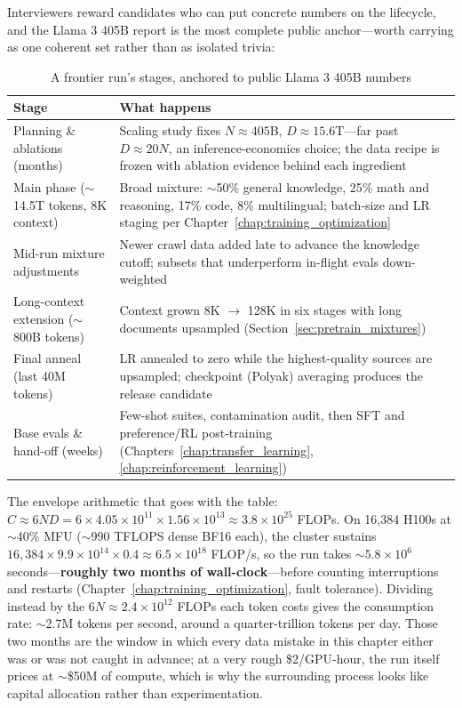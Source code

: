 Interviewers reward candidates who can put concrete numbers on the lifecycle, and the Llama 3 405B report is the most complete public anchor---worth carrying as one coherent set rather than as isolated trivia:

\begin{table}[H]
\centering
\small
\caption{A frontier run's stages, anchored to public Llama 3 405B numbers}
\label{tab:pretrain_reference_run}
\begin{tabularx}{\textwidth}{lX}
\toprule
\textbf{Stage} & \textbf{What happens} \\
\midrule
Planning \& ablations (months) & Scaling study fixes $N \approx 405$B, $D \approx 15.6$T---far past $D \approx 20N$, an inference-economics choice; the data recipe is frozen with ablation evidence behind each ingredient \\
Main phase ($\sim$14.5T tokens, 8K context) & Broad mixture: $\sim$50\% general knowledge, 25\% math and reasoning, 17\% code, 8\% multilingual; batch-size and LR staging per Chapter~\ref{chap:training_optimization} \\
Mid-run mixture adjustments & Newer crawl data added late to advance the knowledge cutoff; subsets that underperform in-flight evals down-weighted \\
Long-context extension ($\sim$800B tokens) & Context grown 8K $\rightarrow$ 128K in six stages with long documents upsampled (Section~\ref{sec:pretrain_mixtures}) \\
Final anneal (last 40M tokens) & LR annealed to zero while the highest-quality sources are upsampled; checkpoint (Polyak) averaging produces the release candidate \\
Base evals \& hand-off (weeks) & Few-shot suites, contamination audit, then SFT and preference/RL post-training (Chapters~\ref{chap:transfer_learning}, \ref{chap:reinforcement_learning}) \\
\bottomrule
\end{tabularx}
\end{table}

The envelope arithmetic that goes with the table: $C \approx 6ND = 6 \times 4.05 \times 10^{11} \times 1.56 \times 10^{13} \approx 3.8 \times 10^{25}$ FLOPs. On 16{,}384 H100s at $\sim$40\% MFU ($\sim$990 TFLOPS dense BF16 each), the cluster sustains $16{,}384 \times 9.9 \times 10^{14} \times 0.4 \approx 6.5 \times 10^{18}$ FLOP/s, so the run takes $\sim 5.8 \times 10^{6}$ seconds---\textbf{roughly two months of wall-clock}---before counting interruptions and restarts (Chapter~\ref{chap:training_optimization}, fault tolerance). Dividing instead by the $6N \approx 2.4 \times 10^{12}$ FLOPs each token costs gives the consumption rate: $\sim$2.7M tokens per second, around a quarter-trillion tokens per day. Those two months are the window in which every data mistake in this chapter either was or was not caught in advance; at a very rough \$2/GPU-hour, the run itself prices at $\sim$\$50M of compute, which is why the surrounding process looks like capital allocation rather than experimentation.

